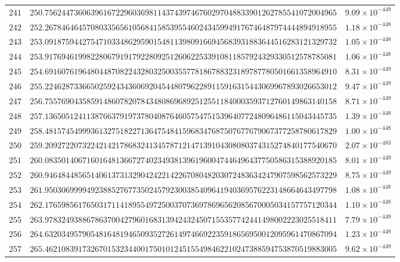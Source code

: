 \documentclass[12pt,reqno]{amsart}
\theoremstyle{remark}
\begin{document}
\begin{longtable}{clc}
$241$ & $250.7562447360639616722960369811437439746760297048833901262785541072004965$ & $9.09\times 10^{-449}$ \\
$242$ & $252.2678464645708033565610568415853955460243459949176746487974444894918955$ & $1.18\times 10^{-448}$ \\
$243$ & $253.0918759442754710334862959015481139809166945683931883644516283121329732$ & $1.05\times 10^{-448}$ \\
$244$ & $253.9176946199822806791917922809251260622533910811857924329330512578785081$ & $1.06\times 10^{-448}$ \\
$245$ & $254.6916076196480448708224328032500355778186788323189787780501661358964910$ & $8.31\times 10^{-449}$ \\
$246$ & $255.2246287336650259243436069204544807962289115916315443069967893026653012$ & $9.47\times 10^{-449}$ \\
$247$ & $256.7557690435859148607820784348086968925125511840003593712760149863140158$ & $8.71\times 10^{-449}$ \\
$248$ & $257.1365051241138766379197378040876460575475153964077248096486115043445735$ & $1.39\times 10^{-448}$ \\
$249$ & $258.4815745499936132751822713647548415968347687507677679067377258780617829$ & $1.00\times 10^{-448}$ \\
$250$ & $259.2092722073224214217868324134578712147139104308080374315274840177540670$ & $2.07\times 10^{-483}$ \\
$251$ & $260.0835014067160164813667274023493813961960047446496437750586315388920185$ & $8.01\times 10^{-449}$ \\
$252$ & $260.9464844856514061373132904242214226708048203072483634247907598562573229$ & $8.75\times 10^{-449}$ \\
$253$ & $261.9503069999492388527677350245792300385409641940369576223148664643497798$ & $1.08\times 10^{-448}$ \\
$254$ & $262.1765985617650317114189554972500370736978696562085670005034157757120344$ & $1.10\times 10^{-448}$ \\
$255$ & $263.9783249388678637004279601683139424324507155357742441498002223025518411$ & $7.79\times 10^{-449}$ \\
$256$ & $264.6320349579054816481946509352726149746692235918656950012095961470867094$ & $1.23\times 10^{-448}$ \\
$257$ & $265.4621083917326701532344001750101245155498462210247388594753870519883005$ & $9.62\times 10^{-449}$ \\

\end{longtable}
\end{document}
